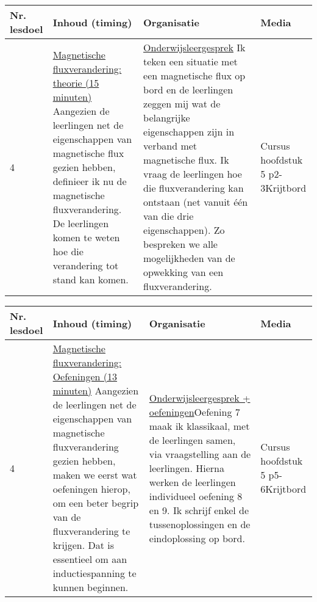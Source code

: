 \begin{landscape}
\begin{tabularx}{1.56\textwidth}{|p{1.5cm}|p{8cm}|X|p{3cm}|}
\hline
\textbf{Nr. lesdoel } & \textbf{Inhoud (timing)}  & \textbf{Organisatie } & \textbf{Media } \\ \hline
4& \underline{Magnetische fluxverandering:} \underline{theorie (15 minuten)}\newline
Aangezien de leerlingen net de eigenschappen van magnetische flux gezien hebben, definieer ik nu de magnetische fluxverandering. De leerlingen komen te weten hoe die verandering tot stand kan komen.
&  \underline{Onderwijsleergesprek}\newline 
Ik teken een situatie met een magnetische flux op bord en de leerlingen zeggen mij wat de belangrijke eigenschappen zijn in verband met magnetische flux. Ik vraag de leerlingen hoe die fluxverandering kan ontstaan (net vanuit één van die drie eigenschappen). Zo bespreken we alle mogelijkheden van de opwekking van een fluxverandering.	
&  Cursus hoofdstuk 5 p2-3\newline\newline Krijtbord
\\ \hline
\end{tabularx}\vspace{5mm}



\begin{tabularx}{1.56\textwidth}{|p{1.5cm}|p{8cm}|X|p{3cm}|}
	\hline
	\textbf{Nr. lesdoel } & \textbf{Inhoud (timing)}  & \textbf{Organisatie } & \textbf{Media } \\ \hline
	4\newline\newline 5& \underline{Magnetische fluxverandering:} \underline{Oefeningen (13 minuten)}\newline
	Aangezien de leerlingen net de eigenschappen van magnetische fluxverandering gezien hebben, maken we eerst wat oefeningen hierop, om een beter begrip van de fluxverandering te krijgen. Dat is essentieel om aan inductiespanning te kunnen beginnen.
	&  \underline{Onderwijsleergesprek + oefeningen}\newline  Oefening 7 maak ik klassikaal, met de leerlingen samen, via vraagstelling aan de leerlingen. Hierna werken de leerlingen individueel oefening 8 en 9. Ik schrijf enkel de tussenoplossingen en de eindoplossing op bord. 
	&  Cursus hoofdstuk 5 p5-6\newline\newline Krijtbord
	\\ \hline
\end{tabularx}\vspace{5mm}



\end{landscape}
